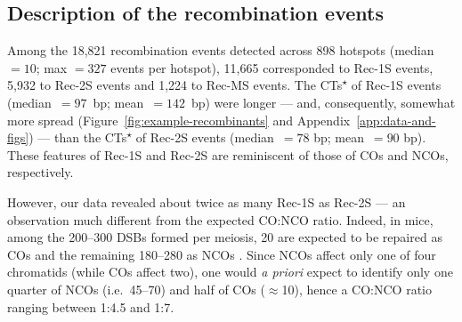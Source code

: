 \subsection{Description of the recombination events} 

Among the 18,821 recombination events detected across 898 hotspots (median~$= 10$; max $= 327$ events per hotspot), 11,665 corresponded to Rec-1S events, 5,932 to Rec-2S events and 1,224 to Rec-MS events.
The CTs\textsuperscript{$\star$} of Rec-1S events (median~$= 97$~bp; mean~$= 142$~bp) were longer — and, consequently, somewhat more spread (Figure~\ref{fig:example-recombinants} and Appendix~\ref{app:data-and-figs}) — than the CTs\textsuperscript{$\star$} of Rec-2S events (median~$= 78$ bp; mean~$= 90$ bp).
These features of Rec-1S and Rec-2S are reminiscent of those of COs and NCOs, respectively.

%

However, our data revealed about twice as many Rec-1S as Rec-2S — an observation much different from the expected CO:NCO ratio.
Indeed, in mice, among the 200--300 DSBs formed per meiosis, 20 are expected to be repaired as COs and the remaining 180--280 as NCOs \citep{baudat2007regulating, martinez-perez2009distribution}. 
Since NCOs affect only one of four chromatids (while COs affect two), one would \textit{a priori} expect to identify only one quarter of NCOs (i.e.\ 45--70) and half of COs ($\approx$10), hence a CO:NCO ratio ranging between 1:4.5 and 1:7. 

